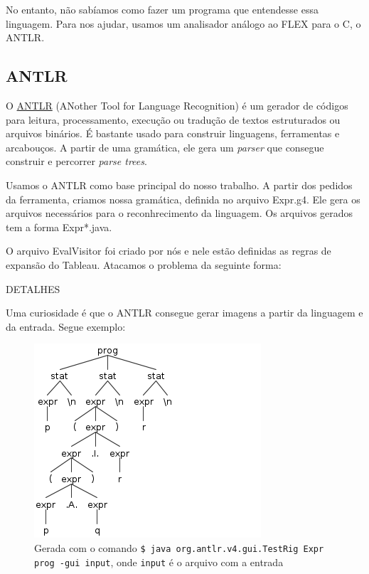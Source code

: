 \documentclass[12pt,letterpaper]{article}
\begin{document}
\quad No entanto, não sabíamos como fazer um programa que entendesse essa linguagem. Para nos ajudar, usamos um analisador análogo ao FLEX para o C, o ANTLR.

\subsection{ANTLR}

\quad O \href{http://www.antlr.org/}{ANTLR} (ANother Tool for Language Recognition)
é um gerador de códigos para leitura, processamento, execução ou tradução de textos estruturados ou arquivos binários. É bastante usado para construir linguagens, ferramentas e arcabouços. A partir de uma gramática, ele gera um \textit{parser} que consegue construir e percorrer \textit{parse trees}.

\quad Usamos o ANTLR como base principal do nosso trabalho. A partir dos pedidos da ferramenta, criamos nossa gramática, definida no arquivo Expr.g4. Ele gera os arquivos necessários para o reconhrecimento da linguagem. Os arquivos gerados tem a forma Expr*.java.

\quad O arquivo EvalVisitor foi criado por nós e nele estão definidas as regras de expansão do Tableau. Atacamos o problema da seguinte forma:

DETALHES

\quad Uma curiosidade é que o ANTLR consegue gerar imagens a partir da linguagem e da entrada. Segue exemplo:

\begin{figure}[!h]
	\centering
	\includegraphics[scale=0.9]{1.png}
	\caption{Gerada com o comando \texttt{\$ java org.antlr.v4.gui.TestRig Expr prog -gui input}, onde \texttt{input} é o arquivo com a entrada}
\end{figure}

\quad 
\end{document}
